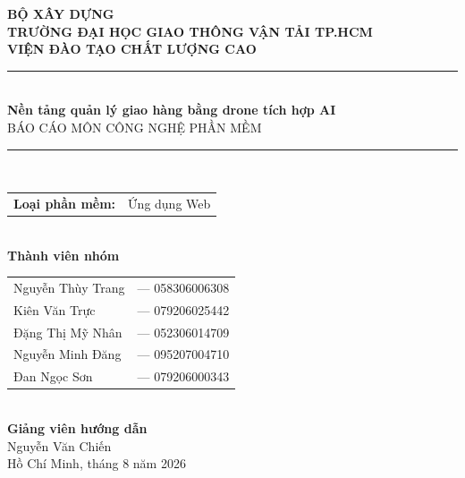 \documentclass[12pt, a4paper]{report}
\newcommand{\IfFileExistsInGraphics}[3]{%
  \IfFileExists{#1}{#2}{%
    \IfFileExists{./so-do/#1}{#2}{%
      \IfFileExists{./chapters/#1}{#2}{#3}%
    }%
  }%
}
\renewcommand{\includegraphics}[2][]{%
  \IfFileExistsInGraphics{#2}{%
    \oldincludegraphics[#1]{#2}%
  }{%
    \begin{minipage}{\linewidth}
      \centering
      \framebox[0.9\linewidth]{\rule{0pt}{120pt} [Hình ảnh chưa xuất bản: \detokenize{#2}]}
    \end{minipage}%
  }%
}
\begin{document}
\begin{titlepage}
  \centering
  \vspace*{1cm}
  {\large\bfseries BỘ XÂY DỰNG}\\[0.3cm]
  {\large\bfseries TRƯỜNG ĐẠI HỌC GIAO THÔNG VẬN TẢI TP.HCM}\\[0.3cm]
  {\large\bfseries VIỆN ĐÀO TẠO CHẤT LƯỢNG CAO}\\[1.5cm]
  \rule{\linewidth}{1.5pt}\\[0.3cm]
  {\LARGE\bfseries Nền tảng quản lý giao hàng bằng drone tích hợp AI}\\[0.3cm]
  {\large BÁO CÁO MÔN CÔNG NGHỆ PHẦN MỀM}\\[0.3cm]
  \rule{\linewidth}{1.5pt}\\[1.5cm]
  \begin{tabular}{ll}
    \textbf{Loại phần mềm:} & Ứng dụng Web \\
  \end{tabular}\\[1.5cm]
  \textbf{Thành viên nhóm}\\[0.5cm]
  \begin{tabular}{ll}
    Nguyễn Thùy Trang & --- 058306006308 \\
    Kiên Văn Trực & --- 079206025442 \\
    Đặng Thị Mỹ Nhân & --- 052306014709 \\
    Nguyễn Minh Đăng & --- 095207004710 \\
    Đan Ngọc Sơn & --- 079206000343 \\
  \end{tabular}\\[1cm]
  \textbf{Giảng viên hướng dẫn}\\[0.3cm]
  Nguyễn Văn Chiến \\[0.5cm]

  \vfill
  {\large Hồ Chí Minh, tháng {8} năm {2026}}
\end{titlepage}

\tableofcontents

\clearpage
\end{document}
